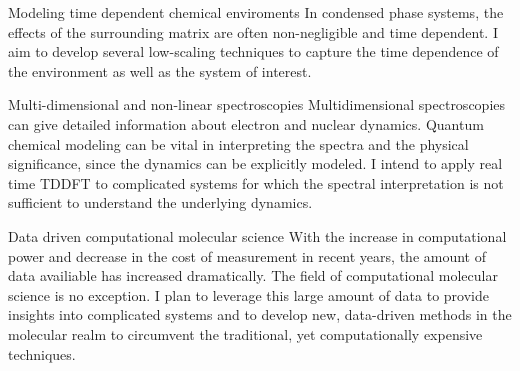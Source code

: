 


\begin{cventries}

\vspace{0.6mm}
\cventry
{} %
{Modeling time dependent chemical enviroments} %
{} %
{} %
{ %
		\qquad In condensed phase systems, the effects of the surrounding 
    matrix are often non-negligible and time dependent. I aim to develop
	several low-scaling techniques to capture the time dependence of the
	environment as well as the system of interest.
}


\vspace{1.1mm}
\cventry
{} %
{Multi-dimensional and non-linear spectroscopies} %
{} %
{} %
{ \qquad Multidimensional spectroscopies can give detailed
information about electron and nuclear dynamics. Quantum chemical modeling can
be vital in interpreting the spectra and the physical significance, since the
dynamics can be explicitly modeled. I intend to apply real time TDDFT to
complicated systems for which the spectral interpretation is not sufficient to
understand the underlying dynamics.} %

\vspace{1.1mm}
\cventry
{} %
{Data driven computational molecular science} %
{} %
{} %
{ \qquad With the increase in computational power and decrease in the cost of
measurement in recent years, the amount of data availiable has increased
dramatically. The field of computational molecular science is no exception. I
plan to leverage this large amount of data to provide insights into complicated
systems and to develop new, data-driven methods in the molecular realm to
circumvent the traditional, yet computationally expensive techniques. } %



\end{cventries}
